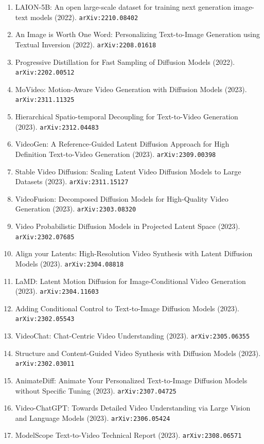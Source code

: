 \documentclass[11pt]{article}
\begin{document}
\begin{enumerate}
  Networks (2022). \texttt{arXiv:2202.10571}
  \item LAION-5B: An open large-scale dataset for training next generation
  image-text models (2022). \texttt{arXiv:2210.08402}
  \item An Image is Worth One Word: Personalizing Text-to-Image Generation using
  Textual Inversion (2022). \texttt{arXiv:2208.01618}
  \item Progressive Distillation for Fast Sampling of Diffusion Models (2022). \texttt{arXiv:2202.00512}
  \item MoVideo: Motion-Aware Video Generation with Diffusion Models (2023). \texttt{arXiv:2311.11325}
  \item Hierarchical Spatio-temporal Decoupling for Text-to-Video Generation (2023). \texttt{arXiv:2312.04483}
  \item VideoGen: A Reference-Guided Latent Diffusion Approach for High
  Definition Text-to-Video Generation (2023). \texttt{arXiv:2309.00398}
  \item Stable Video Diffusion: Scaling Latent Video Diffusion Models to Large
  Datasets (2023). \texttt{arXiv:2311.15127}
  \item VideoFusion: Decomposed Diffusion Models for High-Quality Video
  Generation (2023). \texttt{arXiv:2303.08320}
  \item Video Probabilistic Diffusion Models in Projected Latent Space (2023). \texttt{arXiv:2302.07685}
  \item Align your Latents: High-Resolution Video Synthesis with Latent
  Diffusion Models (2023). \texttt{arXiv:2304.08818}
  \item LaMD: Latent Motion Diffusion for Image-Conditional Video Generation (2023). \texttt{arXiv:2304.11603}
  \item Adding Conditional Control to Text-to-Image Diffusion Models (2023). \texttt{arXiv:2302.05543}
  \item VideoChat: Chat-Centric Video Understanding (2023). \texttt{arXiv:2305.06355}
  \item Structure and Content-Guided Video Synthesis with Diffusion Models (2023). \texttt{arXiv:2302.03011}
  \item AnimateDiff: Animate Your Personalized Text-to-Image Diffusion Models
  without Specific Tuning (2023). \texttt{arXiv:2307.04725}
  \item Video-ChatGPT: Towards Detailed Video Understanding via Large Vision and
  Language Models (2023). \texttt{arXiv:2306.05424}
  \item ModelScope Text-to-Video Technical Report (2023). \texttt{arXiv:2308.06571}

\end{enumerate}
\end{document}
